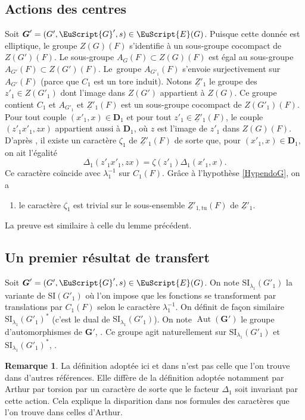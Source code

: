 \documentclass[JEP,XML,SOM,Unicode,francais]{cedram}
\let\mathcal \EuScript
\newcommand{\SI}{\mathrm{SI}}
\newcommand{\tu}{\mathrm{tu}}
\DeclareMathOperator{\Aut}{Aut}
\newcommand{\bD}{\boldsymbol{D}}
\newcommand{\bG}{\boldsymbol{G}}
\newcommand{\cE}{\mathcal{E}}
\newcommand{\cG}{\mathcal{G}}
\theoremstyle{plain}
\theoremstyle{definition}
\newtheorem*{rem*}{Remarque}
\begin{document}
\subsection{Actions des centres}\label{actiondescentres}
Soit $\bG'=(G',\cG',s)\in \cE(G)$. Puisque cette donnée est elliptique, le groupe $Z(G)(F)$ s'identifie à un sous-groupe cocompact de $Z(G')(F)$. Le sous-groupe $A_{G}(F)\subset Z(G)(F)$ est égal au sous-groupe $A_{G'}(F)\subset Z(G')(F)$. Le~groupe $A_{G'_{1}}(F)$ s'envoie surjectivement sur $A_{G'}(F)$ (parce que $C_{1}$ est un tore induit). Notons $\underline{Z}'_{1}$ le groupe des $z'_{1}\in Z(G'_{1})$ dont l'image dans $Z(G')$ appartient à $Z(G)$. Ce groupe contient $C_{1}$ et $A_{G'_{1}}$ et $ \underline{Z}'_{1}(F)$ est un sous-groupe cocompact de $Z(G'_{1})(F)$. Pour tout couple $(x'_{1},x)\in \bD_{1}$ et pour tout $z'_{1}\in \underline{Z}'_{1}(F)$, le couple $(z'_{1}x'_{1},zx)$ appartient aussi à $\bD_{1}$, où $z$ est l'image de $z'_{1}$ dans $Z(G)(F)$. D'après \cite[Lem.\,4.4.A]{LS}, il existe un caractère $\zeta_{1}$ de $\underline{Z}'_{1}(F)$ de sorte que, pour $(x'_{1},x)\in \bD_{1}$, on ait l'égalité
\[
\Delta_{1}(z'_{1}x'_{1},zx)=\zeta(z'_{1})\Delta_{1}(x'_{1},x).
\]
Ce caractère coïncide avec $\lambda_{1}^{-1}$ sur $C_{1}(F)$.
Grâce à l'hypothèse \ref{HypendoG}, on a
\begin{enumerate}
\item\label{actiondescentres1}
le caractère $\zeta_{1}$ est trivial sur le sous-ensemble $\underline{Z}'_{1,\tu}(F)$ de $\underline{Z}'_{1}$.
\end{enumerate}

La preuve est similaire à celle du lemme précédent.

\subsection{Un premier résultat de transfert}\label{unpremierresultat}
Soit $\bG'=(G',\cG',s)\in \cE(G)$. On note $\SI_{\lambda_{1}}(G'_{1})$ la variante de $\SI(G'_{1})$ où l'on impose que les fonctions se transforment par translations par $C_{1}(F)$ selon le caractère $\lambda_{1}^{-1}$. On définit de façon similaire $\SI_{\lambda_{1}}(G'_{1})^*$ (c'est le dual de $\SI_{\lambda_{1}}(G'_{1})$). On note $\Aut(\bG')$ le groupe d'automorphismes de $\bG'$, \cf \cite[I.1.5]{MW}. Ce groupe agit naturellement sur $\SI_{\lambda_{1}}(G'_{1})$ et $\SI_{\lambda_{1}}(G'_{1})^*$, \cf \cite[I.2.6]{MW}.

\begin{rem*}
La définition adoptée ici et dans \cite{MW} n'est pas celle que l'on trouve dans d'autres références. Elle diffère de la définition adoptée notamment par Arthur par torsion par un caractère de sorte que le facteur $\Delta_{1}$ soit invariant par cette action. Cela explique la disparition dans nos formules des caractères que l'on trouve dans celles d'Arthur.
\end{rem*}
\end{document}
